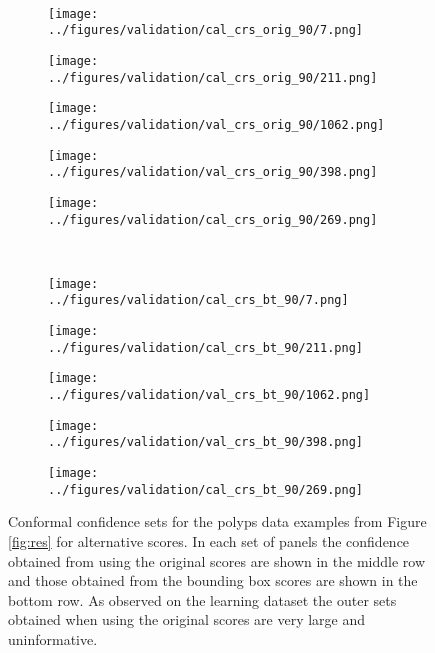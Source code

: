 \begin{figure}[h!]
\begin{subfigure}{0.19\textwidth}
		\label{fig:1}
	\end{subfigure}
	\vspace{-0.35cm}
	\\
	\begin{subfigure}{0.19\textwidth}
		\centering
		\texttt{[image: ../figures/validation/cal\_crs\_orig\_90/7.png]}
		\label{fig:1}
	\end{subfigure}
	\begin{subfigure}{0.19\textwidth}
		\centering
		\texttt{[image: ../figures/validation/cal\_crs\_orig\_90/211.png]}
		\label{fig:1}
	\end{subfigure}
	\begin{subfigure}{0.19\textwidth}
		\centering
		\texttt{[image: ../figures/validation/val\_crs\_orig\_90/1062.png]}
		\label{fig:1}
	\end{subfigure}
	\begin{subfigure}{0.19\textwidth}
		\centering
		\texttt{[image: ../figures/validation/val\_crs\_orig\_90/398.png]}
		\label{fig:1}
	\end{subfigure}
	\begin{subfigure}{0.19\textwidth}
		\centering
		\texttt{[image: ../figures/validation/cal\_crs\_orig\_90/269.png]}
		\label{fig:1}
	\end{subfigure}
	\vspace{-0.35cm}
	\\
	\begin{subfigure}{0.19\textwidth}
		\centering
		\texttt{[image: ../figures/validation/cal\_crs\_bt\_90/7.png]}
		\label{fig:1}
	\end{subfigure}
	\begin{subfigure}{0.19\textwidth}
		\centering
		\texttt{[image: ../figures/validation/cal\_crs\_bt\_90/211.png]}
		\label{fig:1}
	\end{subfigure}
	\begin{subfigure}{0.19\textwidth}
		\centering
		\texttt{[image: ../figures/validation/val\_crs\_bt\_90/1062.png]}
		\label{fig:1}
	\end{subfigure}
	\begin{subfigure}{0.19\textwidth}
		\centering
		\texttt{[image: ../figures/validation/val\_crs\_bt\_90/398.png]}
		\label{fig:1}
	\end{subfigure}
	\begin{subfigure}{0.19\textwidth}
		\centering
		\texttt{[image: ../figures/validation/cal\_crs\_bt\_90/269.png]}
		\label{fig:1}
	\end{subfigure}
	\label{fig:grid}
	\caption{Conformal confidence sets for the polyps data examples from Figure \ref{fig:res} for alternative scores. In each set of panels the confidence obtained from using the original scores are shown in the middle row and those obtained from the bounding box scores are shown in the bottom row. As observed on the learning dataset the outer sets obtained when using the original scores are very large and uninformative.}\label{fig:polpysex}
\end{figure}
\newpage
